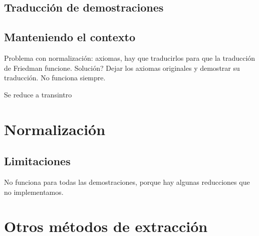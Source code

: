 \subsection{Traducción de demostraciones}
\label{fri:sec:proof-trans}

\subsection{Manteniendo el contexto}

Problema con normalización: axiomas, hay que traducirlos para que la traducción de Friedman funcione. Solución? Dejar los axiomas originales y demostrar su traducción. No funciona siempre.

\begin{lemma}
    Se reduce a transintro
\end{lemma}

\section{Normalización}

\subsection{Limitaciones}

No funciona para todas las demostraciones, porque hay algunas reducciones que no implementamos.

\section{Otros métodos de extracción}

